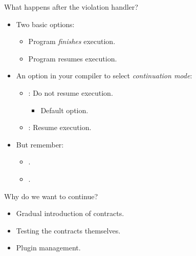 \begin{frame}[t]{What happens after the violation handler?}
\begin{itemize}
  \item Two basic options:
    \begin{itemize}
      \item Program \emph{finishes} execution.
      \item Program resumes execution.
    \end{itemize}

  \vfill\pause
  \item An option in your compiler to select \emph{continuation mode}:
    \begin{itemize}
      \item {}: Do not resume execution.
        \begin{itemize}
          \item Default option.
        \end{itemize}
      \item {}: Resume execution.
    \end{itemize}

  \vfill\pause
  \item But remember:
    \pause
    \begin{itemize}[<+->]
      \item {}.
      \item {}.
    \end{itemize}
\end{itemize}
\end{frame}

\begin{frame}[t]{Why do we want to continue?}
\begin{itemize}
  \item Gradual introduction of contracts.

  \vfill\pause
  \item Testing the contracts themselves.

  \vfill\pause
  \item Plugin management.
\end{itemize}
\end{frame}

